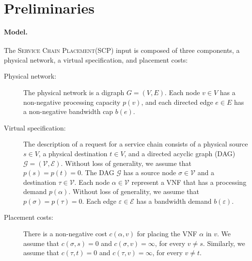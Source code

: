 \documentclass[runningheads]{llncs}
\newcommand{\eps}{\varepsilon}
\newcommand{\scp}{\textsc{SCP}\xspace}
\newcommand{\scplong}{\textsc{Service Chain Placement}\xspace}
\newcommand{\calE}{\mathcal{E}}
\newcommand{\calG}{\mathcal{G}}
\newcommand{\calV}{\mathcal{V}}
\begin{document}
\section{Preliminaries}


\paragraph*{\bf Model.}
%
The \scplong (\scp) input is composed of three components, a physical
network, a virtual specification, and placement costs:
\begin{description}
\item[Physical network:]
%
  The physical network is a digraph $G = (V,E)$.  Each node $v \in V$
  has a non-negative processing capacity $p(v)$, and each directed
  edge $e \in E$ has a non-negative bandwidth cap $b(e)$.

\item[Virtual specification:]
%
  The description of a request for a service chain consists of a
  physical source $s \in V$, a physical destination $t \in V$, and a
  directed acyclic graph (DAG) $\calG = (\calV,\calE)$.
%
  Without loss of generality, we assume that $p(s) = p(t) = 0$.  
%
  The DAG $\calG$ has a source node $\sigma \in \calV$ and a
  destination $\tau \in \calV$. Each node $\alpha \in \calV$ represent
  a VNF that has a processing demand $p(\alpha)$.  Without loss of
  generality, we assume that $p(\sigma) = p(\tau) = 0$.  Each edge
  $\eps \in \calE$ has a bandwidth demand $b(\eps)$.
  
\item[Placement costs:]
%
  There is a non-negative cost $c(\alpha,v)$ for placing the VNF
  $\alpha$ in $v$.  We assume that $c(\sigma,s) = 0$ and $c(\sigma,v)
  = \infty$, for every $v \neq s$.  Similarly, we assume that
  $c(\tau,t) = 0$ and $c(\tau,v) = \infty$, for every $v \neq t$.
\end{description}
\end{document}
